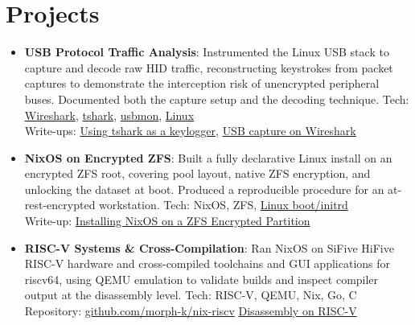 \documentclass[a4paper,11pt]{article}
\newcommand{\resumeItem}[2]{
  \item\small{
    \textbf{#1}{: #2 \vspace{-2pt}}
  }
}
\newcommand{\resumeSubItem}[2]{\resumeItem{#1}{#2}\vspace{-3pt}}
\begin{document}
\section{Projects}
\vspace{5pt}
\begin{itemize}[leftmargin=0pt, label={}]  %
\resumeSubItem{\textbf{USB Protocol Traffic Analysis}}{Instrumented the Linux USB stack to capture and decode raw HID traffic, reconstructing keystrokes from packet captures to demonstrate the interception risk of unencrypted peripheral buses. Documented both the capture setup and the decoding technique. Tech: \href{https://www.wireshark.org/docs/}{Wireshark}, \href{https://www.wireshark.org/docs/man-pages/tshark.html}{tshark}, \href{https://www.kernel.org/doc/html/latest/usb/usbmon.html}{usbmon}, \href{https://www.kernel.org/doc/html/latest/}{Linux} \\Write-ups: \href{https://morphykuffour.github.io/linux/tshark/hacking/2025/02/20/TShark-Keylogger.html}{Using tshark as a keylogger}, \href{https://morphykuffour.github.io/linux/wireshark/2025/02/19/Wireshark-USB-Capture-Setup.html}{USB capture on Wireshark}}
\vspace{2pt}

\resumeSubItem{\textbf{NixOS on Encrypted ZFS}}{Built a fully declarative Linux install on an encrypted ZFS root, covering pool layout, native ZFS encryption, and unlocking the dataset at boot. Produced a reproducible procedure for an at-rest-encrypted workstation. Tech: NixOS, ZFS, \href{https://www.kernel.org/doc/html/latest/admin-guide/initrd.html}{Linux boot/initrd}\\Write-up: \href{https://morphykuffour.github.io/linux/nixos/2024/11/08/NixOs-ZFS.html}{Installing NixOS on a ZFS Encrypted Partition}}
\vspace{2pt}

\resumeSubItem{\textbf{RISC-V Systems \& Cross-Compilation}}{Ran NixOS on SiFive HiFive RISC-V hardware and cross-compiled toolchains and GUI applications for riscv64, using QEMU emulation to validate builds and inspect compiler output at the disassembly level. Tech: RISC-V, QEMU, Nix, Go, C \\Repository: \href{https://github.com/morph-k/nix-riscv}{github.com/morph-k/nix-riscv} \textbar{} \href{https://morphykuffour.github.io/linux/riscv/qemu/ubuntu/sbcl/2025/05/06/SBCL-development-on-riscv-architecture.html}{Disassembly on RISC-V}}
\vspace{2pt}


\end{itemize}
\end{document}
